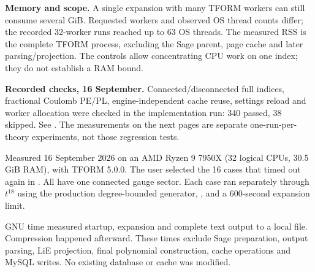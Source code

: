 \textbf{Memory and scope.} A single expansion with many TFORM workers can still
consume several GiB. Requested workers and observed OS thread counts differ;
the recorded 32-worker runs reached up to 63 OS threads. The measured RSS is
the complete TFORM process, excluding the Sage parent, page cache and later
parsing/projection. The controls allow concentrating CPU work on one index;
they do not establish a RAM bound.

\textbf{Recorded checks, 16 September.} Connected/disconnected full indices,
fractional Coulomb PE/PL, engine-independent cache reuse, settings reload and
worker allocation were checked in the implementation run: 340 passed, 38
skipped. See . The measurements on the next
pages are separate one-run-per-theory experiments, not those regression tests.

\clearpage
{}
\label{sec:tform-repeated}
Measured 16 September 2026 on an AMD Ryzen 9 7950X (32 logical CPUs, 30.5 GiB
RAM), with TFORM 5.0.0. The user selected the 16 cases that timed out again in
. All have one connected gauge sector.
Each case ran separately through $t^{18}$ using the production degree-bounded
generator, , and a 600-second expansion limit.

GNU time measured startup, expansion and complete text output to a local file.
Compression happened afterward. These times exclude Sage preparation,
output parsing, LiE projection, final polynomial construction, cache operations
and MySQL writes. No existing database or cache was modified.


